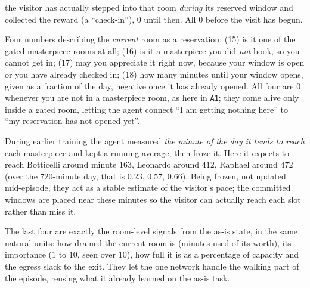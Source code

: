 \documentclass[11pt]{article}
\begin{document}
\begin{description}[leftmargin=0pt,style=nextline,itemsep=3pt]
the visitor has actually stepped into that room \emph{during} its reserved window and collected the
reward (a ``check-in''), $0$ until then. All $0$ before the visit has begun.
\item[Access read of the room you are in \textmd{(slots 15 to 18)}] Four numbers describing the
\emph{current} room as a reservation: (15) is it one of the gated masterpiece rooms at all; (16) is it a
masterpiece you did \emph{not} book, so you cannot get in; (17) may you appreciate it right now, because
your window is open or you have already checked in; (18) how many minutes until your window opens, given
as a fraction of the day, negative once it has already opened. All four are $0$ whenever you are not in
a masterpiece room, as here in \texttt{A1}; they come alive only inside a gated room, letting the agent
connect ``I am getting nothing here'' to ``my reservation has not opened yet''.
\item[Frozen pace estimate \textmd{(slots 19 to 21)}] During earlier training the agent measured
\emph{the minute of the day it tends to reach} each masterpiece and kept a running average, then froze
it. Here it expects to reach Botticelli around minute $163$, Leonardo around $412$, Raphael around $472$
(over the $720$-minute day, that is $0.23$, $0.57$, $0.66$). Being frozen, not updated mid-episode, they
act as a stable estimate of the visitor's pace; the committed windows are placed near these minutes so
the visitor can actually reach each slot rather than miss it.
\item[The room-level tail \textmd{(slots 22 to 25)}] The last four are exactly the room-level signals
from the as-is state, in the same natural units: how drained the current room is (minutes used of its
worth), its importance ($1$ to $10$, seen over $10$), how full it is as a percentage of capacity and the
egress slack to the exit. They let the one network handle the walking part of the episode, reusing what
it already learned on the as-is task.
\end{description}
\end{document}

